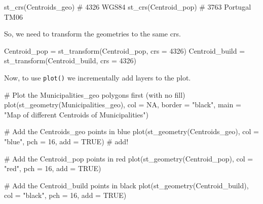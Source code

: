\documentclass[
  letterpaper,
  DIV=11,
  numbers=noendperiod]{scrreprt}
\newenvironment{Shaded}{\begin{snugshade}}{\end{snugshade}}
\newcommand{\AttributeTok}[1]{\textcolor[rgb]{0.40,0.45,0.13}{#1}}
\newcommand{\CommentTok}[1]{\textcolor[rgb]{0.37,0.37,0.37}{#1}}
\newcommand{\ConstantTok}[1]{\textcolor[rgb]{0.56,0.35,0.01}{#1}}
\newcommand{\DecValTok}[1]{\textcolor[rgb]{0.68,0.00,0.00}{#1}}
\newcommand{\FunctionTok}[1]{\textcolor[rgb]{0.28,0.35,0.67}{#1}}
\newcommand{\NormalTok}[1]{\textcolor[rgb]{0.00,0.23,0.31}{#1}}
\newcommand{\OtherTok}[1]{\textcolor[rgb]{0.00,0.23,0.31}{#1}}
\newcommand{\StringTok}[1]{\textcolor[rgb]{0.13,0.47,0.30}{#1}}
\begin{document}
\begin{Shaded}
\begin{Highlighting}[]
\FunctionTok{st\_crs}\NormalTok{(Centroids\_geo) }\CommentTok{\# 4326 WGS84}
\FunctionTok{st\_crs}\NormalTok{(Centroid\_pop) }\CommentTok{\# 3763 Portugal TM06}
\end{Highlighting}
\end{Shaded}

So, we need to transform the geometries to the same crs.

\begin{Shaded}
\begin{Highlighting}[]
\NormalTok{Centroid\_pop }\OtherTok{=} \FunctionTok{st\_transform}\NormalTok{(Centroid\_pop, }\AttributeTok{crs =} \DecValTok{4326}\NormalTok{)}
\NormalTok{Centroid\_build }\OtherTok{=} \FunctionTok{st\_transform}\NormalTok{(Centroid\_build, }\AttributeTok{crs =} \DecValTok{4326}\NormalTok{)}
\end{Highlighting}
\end{Shaded}

Now, to use \texttt{plot()} we incrementally add layers to the plot.

\begin{Shaded}
\begin{Highlighting}[]
\CommentTok{\# Plot the Municipalities\_geo polygons first (with no fill)}
\FunctionTok{plot}\NormalTok{(}\FunctionTok{st\_geometry}\NormalTok{(Municipalities\_geo), }\AttributeTok{col =} \ConstantTok{NA}\NormalTok{, }\AttributeTok{border =} \StringTok{"black"}\NormalTok{, }\AttributeTok{main =} \StringTok{"Map of different Centroids of Municipalities"}\NormalTok{)}

\CommentTok{\# Add the Centroids\_geo points in blue}
\FunctionTok{plot}\NormalTok{(}\FunctionTok{st\_geometry}\NormalTok{(Centroids\_geo), }\AttributeTok{col =} \StringTok{"blue"}\NormalTok{, }\AttributeTok{pch =} \DecValTok{16}\NormalTok{, }\AttributeTok{add =} \ConstantTok{TRUE}\NormalTok{) }\CommentTok{\# add!}

\CommentTok{\# Add the Centroid\_pop points in red}
\FunctionTok{plot}\NormalTok{(}\FunctionTok{st\_geometry}\NormalTok{(Centroid\_pop), }\AttributeTok{col =} \StringTok{"red"}\NormalTok{, }\AttributeTok{pch =} \DecValTok{16}\NormalTok{, }\AttributeTok{add =} \ConstantTok{TRUE}\NormalTok{)}

\CommentTok{\# Add the Centroid\_build points in black}
\FunctionTok{plot}\NormalTok{(}\FunctionTok{st\_geometry}\NormalTok{(Centroid\_build), }\AttributeTok{col =} \StringTok{"black"}\NormalTok{, }\AttributeTok{pch =} \DecValTok{16}\NormalTok{, }\AttributeTok{add =} \ConstantTok{TRUE}\NormalTok{)}
\end{Highlighting}
\end{Shaded}
\end{document}
